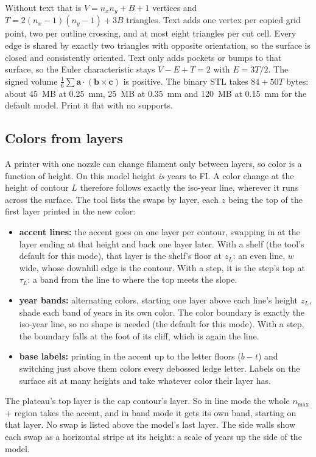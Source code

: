 \documentclass[11pt,letterpaper]{article}
\begin{document}
Without text that is $V = n_x n_y + B + 1$ vertices and $T = 2(n_x - 1)(n_y - 1) + 3B$ triangles. Text adds one vertex per copied grid point, two per outline crossing, and at most eight triangles per cut cell. Every edge is shared by exactly two triangles with opposite orientation, so the surface is closed and consistently oriented. Text only adds pockets or bumps to that surface, so the Euler characteristic stays $V - E + T = 2$ with $E = 3T/2$. The signed volume $\frac16\sum \mathbf a\cdot(\mathbf b \times \mathbf c)$ is positive. The binary STL takes $84 + 50T$ bytes: about 45~MB at 0.25~mm, 25~MB at 0.35~mm and 120~MB at 0.15~mm for the default model. Print it flat with no supports.

\subsection{Colors from layers}

A printer with one nozzle can change filament only between layers, so color is a function of height. On this model height \emph{is} years to FI. A color change at the height of contour $L$ therefore follows exactly the iso-year line, wherever it runs across the surface. The tool lists the swaps by layer, each $z$ being the top of the first layer printed in the new color:
\begin{itemize}
\setlength\itemsep{1pt}
\item \textbf{accent lines:} the accent goes on one layer per contour, swapping in at the layer ending at that height and back one layer later. With a shelf (the tool's default for this mode), that layer is the shelf's floor at $z_L$: an even line, $w$ wide, whose downhill edge is the contour. With a step, it is the step's top at $\tau_L$: a band from the line to where the top meets the slope.
\item \textbf{year bands:} alternating colors, starting one layer above each line's height $z_L$, shade each band of years in its own color. The color boundary is exactly the iso-year line, so no shape is needed (the default for this mode). With a step, the boundary falls at the foot of its cliff, which is again the line.
\item \textbf{base labels:} printing in the accent up to the letter floors ($b - t$) and switching just above them colors every debossed ledge letter. Labels on the surface sit at many heights and take whatever color their layer has.
\end{itemize}
The plateau's top layer is the cap contour's layer. So in line mode the whole $n_{\max}$+ region takes the accent, and in band mode it gets its own band, starting on that layer. No swap is listed above the model's last layer. The side walls show each swap as a horizontal stripe at its height: a scale of years up the side of the model.
\end{document}
